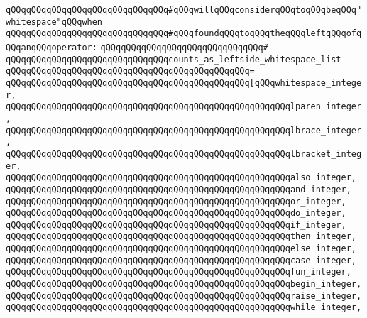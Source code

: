 \verb|qQQqqQQqqQQqqQQqqQQqqQQqqQQqqQQq#qQQqwillqQQqconsiderqQQqtoqQQqbeqQQq"whitespace"qQQqwhen|\newline
\verb|qQQqqQQqqQQqqQQqqQQqqQQqqQQqqQQq#qQQqfoundqQQqtoqQQqtheqQQqleftqQQqofqQQqanqQQqoperator:|\newline
\verb|qQQqqQQqqQQqqQQqqQQqqQQqqQQqqQQq#|\newline
\verb|qQQqqQQqqQQqqQQqqQQqqQQqqQQqqQQqcounts_as_leftside_whitespace_list|\newline
\verb|qQQqqQQqqQQqqQQqqQQqqQQqqQQqqQQqqQQqqQQqqQQqqQQq=|\newline
\verb|qQQqqQQqqQQqqQQqqQQqqQQqqQQqqQQqqQQqqQQqqQQqqQQq[qQQqwhitespace_integer,|\newline
\verb|qQQqqQQqqQQqqQQqqQQqqQQqqQQqqQQqqQQqqQQqqQQqqQQqqQQqqQQqlparen_integer,|\newline
\verb|qQQqqQQqqQQqqQQqqQQqqQQqqQQqqQQqqQQqqQQqqQQqqQQqqQQqqQQqlbrace_integer,|\newline
\verb|qQQqqQQqqQQqqQQqqQQqqQQqqQQqqQQqqQQqqQQqqQQqqQQqqQQqqQQqlbracket_integer,|\newline
\verb|qQQqqQQqqQQqqQQqqQQqqQQqqQQqqQQqqQQqqQQqqQQqqQQqqQQqqQQqalso_integer,|\newline
\verb|qQQqqQQqqQQqqQQqqQQqqQQqqQQqqQQqqQQqqQQqqQQqqQQqqQQqqQQqand_integer,|\newline
\verb|qQQqqQQqqQQqqQQqqQQqqQQqqQQqqQQqqQQqqQQqqQQqqQQqqQQqqQQqor_integer,|\newline
\verb|qQQqqQQqqQQqqQQqqQQqqQQqqQQqqQQqqQQqqQQqqQQqqQQqqQQqqQQqdo_integer,|\newline
\verb|qQQqqQQqqQQqqQQqqQQqqQQqqQQqqQQqqQQqqQQqqQQqqQQqqQQqqQQqif_integer,|\newline
\verb|qQQqqQQqqQQqqQQqqQQqqQQqqQQqqQQqqQQqqQQqqQQqqQQqqQQqqQQqthen_integer,|\newline
\verb|qQQqqQQqqQQqqQQqqQQqqQQqqQQqqQQqqQQqqQQqqQQqqQQqqQQqqQQqelse_integer,|\newline
\verb|qQQqqQQqqQQqqQQqqQQqqQQqqQQqqQQqqQQqqQQqqQQqqQQqqQQqqQQqcase_integer,|\newline
\verb|qQQqqQQqqQQqqQQqqQQqqQQqqQQqqQQqqQQqqQQqqQQqqQQqqQQqqQQqfun_integer,|\newline
\verb|qQQqqQQqqQQqqQQqqQQqqQQqqQQqqQQqqQQqqQQqqQQqqQQqqQQqqQQqbegin_integer,|\newline
\verb|qQQqqQQqqQQqqQQqqQQqqQQqqQQqqQQqqQQqqQQqqQQqqQQqqQQqqQQqraise_integer,|\newline
\verb|qQQqqQQqqQQqqQQqqQQqqQQqqQQqqQQqqQQqqQQqqQQqqQQqqQQqqQQqwhile_integer,|\newline
